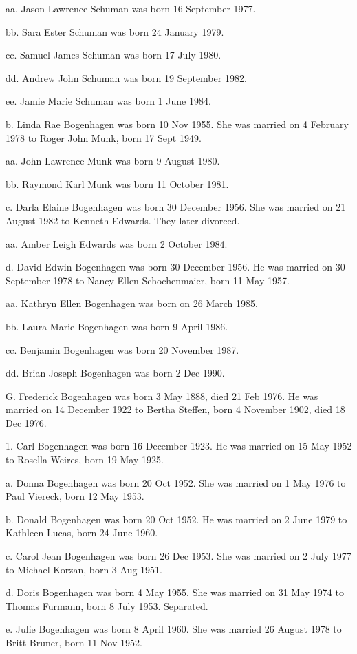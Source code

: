 \documentclass[a4paper]{article}
\begin{document}
aa. Jason Lawrence Schuman was born 16 September 1977.

bb. Sara Ester Schuman was born 24 January 1979.

cc. Samuel James Schuman was born 17 July 1980. 

dd. Andrew John Schuman was born 19 September 1982.

ee. Jamie Marie Schuman was born 1 June 1984. 

b. Linda Rae Bogenhagen was born 10 Nov 1955.  She was married on 4 February 1978 to Roger John Munk, born 17 Sept 1949.

aa. John Lawrence Munk was born 9 August 1980.

bb. Raymond Karl Munk was born 11 October 1981.

c. Darla Elaine Bogenhagen was born 30 December 1956. She was married on 21 August 1982 to Kenneth Edwards.  They later divorced.

aa. Amber Leigh Edwards was born 2 October 1984.

d. David Edwin Bogenhagen was born 30 December 1956.  He was married on 30 September 1978 to Nancy Ellen Schochenmaier, born 11 May 1957.

aa. Kathryn Ellen Bogenhagen was born on 26 March 1985.

bb. Laura Marie Bogenhagen was born 9 April 1986.

cc. Benjamin Bogenhagen was born 20 November 1987.

dd. Brian Joseph Bogenhagen was born 2 Dec 1990.

G. Frederick Bogenhagen was born 3 May 1888, died 21 Feb 1976.  He was married on 14 December 1922 to Bertha Steffen, born 4 November 1902, died 18 Dec 1976.

1. Carl Bogenhagen was born 16 December 1923.  He was married on 15 May 1952 to Rosella Weires, born 19 May 1925.

a. Donna Bogenhagen was born 20 Oct 1952.  She was married on 1 May 1976 to Paul Viereck, born 12 May 1953.
 
b. Donald Bogenhagen was born 20 Oct 1952.  He was married on 2 June 1979 to Kathleen Lucas, born 24 June 1960.
 
c. Carol Jean Bogenhagen was born 26 Dec 1953.  She was married on 2 July 1977 to Michael Korzan, born 3 Aug 1951.
 
d. Doris Bogenhagen was born 4 May 1955.  She was married on 31 May 1974 to Thomas Furmann, born 8 July 1953.  Separated.
 
e. Julie Bogenhagen was born 8 April 1960.  She was married 26 August 1978 to Britt Bruner, born 11 Nov 1952.
 
\end{document}
